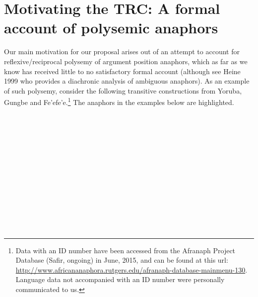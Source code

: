 \documentclass[output=paper]{langsci/langscibook}
\begin{document}
 
\section{Motivating the TRC: A formal account of polysemic anaphors}



  Our main motivation for our proposal arises out of an attempt to account for reflexive/reciprocal polysemy of argument position anaphors, which as far as we know has received little to no satisfactory formal account (although see Heine 1999 who provides a diachronic analysis of ambiguous anaphors). As an example of such polysemy, consider the following transitive constructions from Yoruba, Gungbe and Fe'efe'e.\footnote{ Data with an ID number have been accessed from the Afranaph Project Database (Safir, ongoing) in June, 2015, and can be found at this url: \url{http://www.africananaphora.rutgers.edu/afranaph-database-mainmenu-130}. Language data not accompanied with an ID number were personally communicated to us.} The anaphors in the examples below are highlighted.




\ea\label{ex:}
 \\
\ea\label{ex:}
 \\
\ea\label{ex:}
\\
\ea\label{ex:}
\\


\ea\label{ex:}
 \\
\ea\label{ex:}
 \\
\ea\label{ex:}
\\
\ea\label{ex:}
\\


\ea\label{ex:}
 \\
\ea\label{ex:}
 \\
\ea\label{ex:}
\\
\ea\label{ex:}
\\
\end{document}
